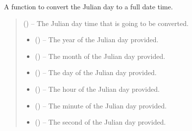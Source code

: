 \documentclass[letterpaper,11pt,english]{sphinxmanual}
\begin{document}
\begin{savenotes}\begin{fulllineitems}
\label{\detokenize{code/opihiexarata.library.conversion:opihiexarata.library.conversion.julian_day_to_full_date}}
\pysigstartsignatures
{}
\pysigstopsignatures
\sphinxAtStartPar
A function to convert the Julian day to a full date time.
\begin{quote}\begin{description}
\sphinxAtStartPar
{} () – The Julian day time that is going to be converted.

\sphinxAtStartPar
\begin{itemize}
\item {} 
\sphinxAtStartPar
{} () – The year of the Julian day provided.

\item {} 
\sphinxAtStartPar
{} () – The month of the Julian day provided.

\item {} 
\sphinxAtStartPar
{} () – The day of the Julian day provided.

\item {} 
\sphinxAtStartPar
{} () – The hour of the Julian day provided.

\item {} 
\sphinxAtStartPar
{} () – The minute of the Julian day provided.

\item {} 
\sphinxAtStartPar
{} () – The second of the Julian day provided.

\end{itemize}


\end{description}\end{quote}

\end{fulllineitems}\end{savenotes}
\end{document}
